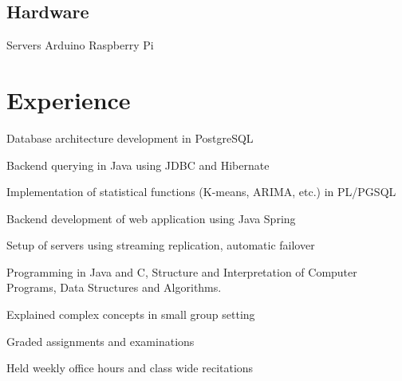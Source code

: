 \documentclass[]{deedy-resume}
\begin{document}
\begin{minipage}[t]{0.33\textwidth}
\subsection{Hardware}
Servers \textbullet{}
Arduino \textbullet{}
Raspberry Pi \\


%
%

\end{minipage} 
\hfill
\begin{minipage}[t]{0.66\textwidth} 


\section{Experience}

\vspace{\topsep} %
\begin{tightemize}\item Database architecture development in PostgreSQL
\item Backend querying in Java using JDBC and Hibernate
\item Implementation of statistical functions (K-means, ARIMA, etc.) in PL/PGSQL
\item Backend development of web application using Java Spring
\item Setup of servers using streaming replication, automatic failover
\end{tightemize}
\sectionsep

\begin{tightemize}
\item Programming in Java and C, Structure and Interpretation of Computer Programs, Data Structures and Algorithms.
\item Explained complex concepts in small group setting
\item Graded assignments and examinations
\item Held weekly office hours and class wide recitations
\end{tightemize}
\sectionsep


\end{minipage}
\end{document}
